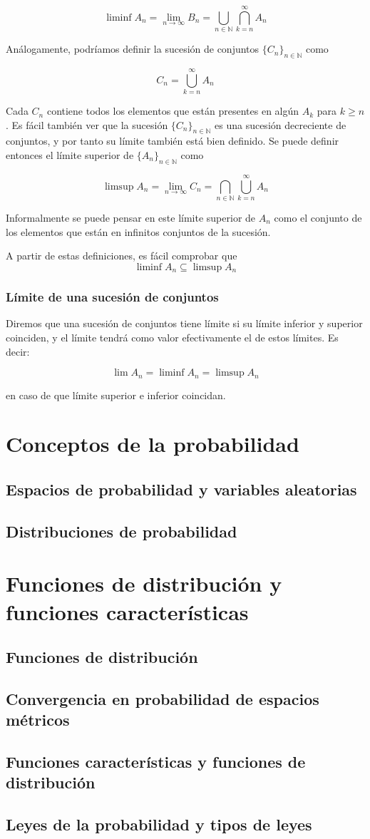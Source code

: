\documentclass[12pt,a4paper,openright]{book}
\begin{document}
 $$ \liminf A_n = \lim_{n\to\infty} B_n = \bigcup_{n\in\mathbb{N}} \bigcap_{k=n}^{\infty} A_n $$

 Análogamente, podríamos definir la sucesión de conjuntos $\{C_n\}_{n\in\mathbb{N}}$ como

 $$ C_n = \bigcup_{k=n}^{\infty} A_n $$

Cada $C_n$ contiene todos los elementos que están presentes en algún $A_k$ para $k \geq n$. Es fácil también ver que la sucesión $\{C_n\}_{n\in\mathbb{N}}$ es una sucesión decreciente de conjuntos, y por tanto su límite también está bien definido. Se puede definir entonces el límite superior de $\{A_n\}_{n\in\mathbb{N}}$
como 

$$ \limsup A_n = \lim_{n\to\infty} C_n = \bigcap_{n\in\mathbb{N}} \bigcup_{k=n}^{\infty} A_n $$

Informalmente se puede pensar en este límite superior de $A_n$ como el conjunto de los elementos que están en infinitos conjuntos de la sucesión.

A partir de estas definiciones, es fácil comprobar que 
$$ \liminf A_n \subseteq \limsup A_n $$

\subsection{Límite de una sucesión de conjuntos}
Diremos que una sucesión de conjuntos tiene límite si su límite inferior y superior coinciden, y el límite tendrá como valor efectivamente el de estos límites. Es decir: 



$$ \lim A_n = \liminf A_n = \limsup A_n $$ 

en caso de que límite superior e inferior coincidan.
\chapter{Conceptos de la probabilidad}
\section{Espacios de probabilidad y variables aleatorias}
\section{Distribuciones de probabilidad}
\chapter{Funciones de distribución y funciones características}
\section{Funciones de distribución}
\section{Convergencia en probabilidad de espacios métricos}
\section{Funciones características y funciones de distribución}
\section{Leyes de la probabilidad y tipos de leyes}
\end{document}
